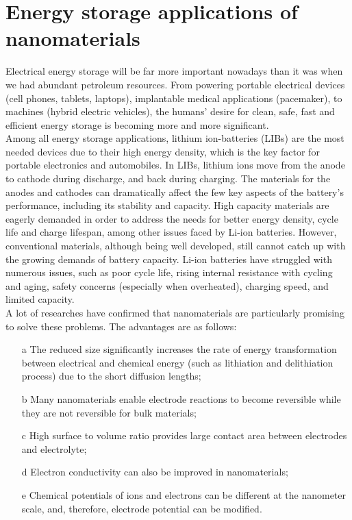 \section{Energy storage applications of nanomaterials}
Electrical energy storage will be far more important nowadays than it was when we had abundant petroleum resources. From powering portable electrical devices (cell phones, tablets, laptops), implantable medical applications (pacemaker), to machines (hybrid electric vehicles), the humans' desire for clean, safe, fast and efficient energy storage is becoming more and more  significant. \\
Among all energy storage applications, lithium ion-batteries (LIBs) are the most needed devices due to their high energy density, which is the key factor for portable electronics and automobiles. In LIBs, lithium ions move from the anode to cathode during discharge, and back during charging. The materials for the anodes and cathodes can dramatically affect the few key aspects of the battery’s performance, including its stability and capacity. High capacity materials are eagerly demanded in order to address the needs for better energy density, cycle life and charge lifespan, among other issues faced by Li-ion batteries. 
However, conventional materials, although being  well developed,  still cannot catch up with the growing demands of battery capacity. Li-ion batteries have struggled with numerous issues, such as poor cycle life, rising internal resistance with cycling and aging, safety concerns (especially when overheated), charging speed, and limited capacity. \\
A lot of researches have confirmed that nanomaterials are particularly promising to solve these problems. The advantages are as follows\cite{Bruce2008,qifengzhang2013csr}: \\
\begin{itemize}
	\item[a] The reduced size significantly increases the rate of energy transformation between electrical and chemical energy (such as lithiation and delithiation process) due to the short diffusion lengths; 
	\item[b] Many nanomaterials enable electrode reactions to become reversible while they are not reversible for bulk materials; 
	\item[c] High surface to volume ratio provides large contact area between electrodes and electrolyte; 
	\item[d] Electron conductivity can also be improved in nanomaterials; 
	\item[e] Chemical potentials of ions and electrons can be different at the nanometer scale, and, therefore, electrode potential can be modified. 
\end{itemize}

